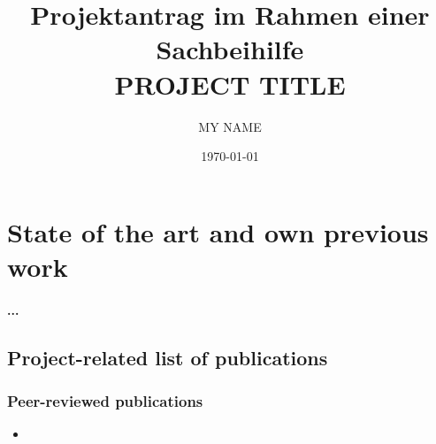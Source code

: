 \documentclass[a4paper,11pt]{article} %
\begin{document}
\title{{\small Projektantrag im Rahmen einer Sachbeihilfe}\\{\bf \LARGE PROJECT TITLE}}
\author{MY NAME}
\date{\today}
\maketitle


\section{State of the art and own previous work}
\paragraph{...}

\subsection{Project-related list of publications}

\subsubsection{Peer-reviewed publications}



\begin{itemize}
  \item {}
\end{itemize}
\end{document}
